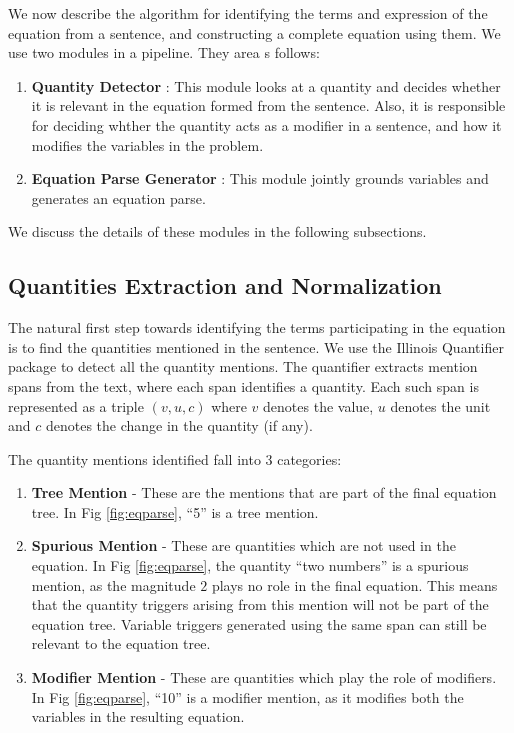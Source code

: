   We now describe the algorithm for identifying the terms and
  expression of the equation from a sentence, and constructing a
  complete equation using them. We use two modules in a pipeline. They
  area s follows:
  \begin{enumerate}
    \item \textbf{Quantity Detector} : This module looks at a quantity
      and decides whether it is relevant in the equation formed from
      the sentence. Also, it is responsible for deciding whther the
      quantity acts as a modifier in a sentence, and how it 
      modifies the variables in the problem.
      
    \item \textbf{Equation Parse Generator} : This module jointly
      grounds variables and generates an equation parse.
  \end{enumerate}

  We discuss the details of these modules in the following subsections.
  
  \subsection{Quantities Extraction and Normalization}
    The natural first step towards identifying the terms participating
    in the equation is to find the quantities mentioned in the
    sentence. We use the Illinois Quantifier package \cite{RoyViRo15}
    to detect all the quantity mentions.  The quantifier extracts
    mention spans from the text, where each span identifies a
    quantity. Each such span is represented as a triple $(v,u,c)$
    where $v$ denotes the value, $u$ denotes the unit and $c$ denotes
    the change in the quantity (if any).

    The quantity mentions identified fall into 3 categories:
    \begin{enumerate}
    \item {\bf Tree Mention} - These are the mentions that are part of
      the final equation tree. In Fig \ref{fig:eqparse}, ``5'' is a tree
      mention.

    \item {\bf Spurious Mention} - These are quantities which are not
      used in the equation.  In Fig \ref{fig:eqparse}, the quantity
      ``two numbers'' is a spurious mention, as the magnitude $2$
      plays no role in the final equation. This means that the
      quantity triggers arising from this mention will not be part of
      the equation tree.  Variable triggers generated using the same
      span can still be relevant to the equation tree.

    \item {\bf Modifier Mention} - These are quantities which play the
      role of modifiers. In Fig \ref{fig:eqparse}, ``10'' is a
      modifier mention, as it modifies both the variables in the
      resulting equation.
    \end{enumerate}


